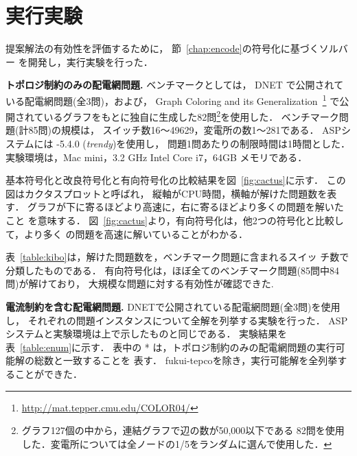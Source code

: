 \section{実行実験}\label{chap:exp}


提案解法の有効性を評価するために，
節~\ref{chap:encode}の符号化に基づくソルバー
を開発し，実行実験を行った．

\textbf{トポロジ制約のみの配電網問題.}
ベンチマークとしては，
DNET%
で公開されている配電網問題(全3問)，および，
Graph Coloring and its Generalization~\footnote{\url{http://mat.tepper.cmu.edu/COLOR04/}}
で公開されているグラフをもとに独自に生成した82問\footnote{%
グラフ127個の中から，連結グラフで辺の数が50,000以下である
82問を使用した．変電所については全ノードの1/5をランダムに選んで使用した．}を使用した．
ベンチマーク問題(計85問)の規模は，
スイッチ数16〜49629，変電所の数1〜281である．
%
ASPシステムには {\clingo}-5.4.0 (\textit{trendy})を使用し，
問題1問あたりの制限時間は1時間とした．
実験環境は，Mac mini，3.2 GHz Intel Core i7，64GB メモリである．

基本符号化と改良符号化と有向符号化の比較結果を図~\ref{fig:cactus}に示す．
この図はカクタスプロットと呼ばれ，
縦軸がCPU時間，横軸が解けた問題数を表す．
グラフが下に寄るほどより高速に，右に寄るほどより多くの問題を解いたこと
を意味する．
図~\ref{fig:cactus}より，有向符号化は，他2つの符号化と比較して，より多く
の問題を高速に解いていることがわかる．

表~\ref{table:kibo}は，解けた問題数を，ベンチマーク問題に含まれるスイッ
チ数で分類したものである．
有向符号化は，ほぼ全てのベンチマーク問題(85問中84問)が解けており，
大規模な問題に対する有効性が確認できた. 

\textbf{電流制約を含む配電網問題.}
DNETで公開されている配電網問題(全3問)を使用し，
それぞれの問題インスタンスについて全解を列挙する実験を行った．
ASPシステムと実験環境は上で示したものと同じである．
実験結果を表~\ref{table:enum}に示す．
表中の * は，トポロジ制約のみの配電網問題の実行可能解の総数と一致することを
表す．
\textsf{fukui-tepco}を除き，実行可能解を全列挙することができた．

